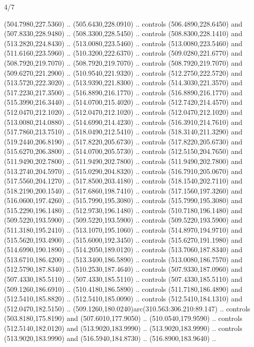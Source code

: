 \begin{flagdescription}{4/7}
\begin{scope}[shift={(0.5\flaglength,0.5\flagwidth)},scale=\flagwidth*\stretchfactor/820]
\begin{scope}[scale=1.87,xshift=-138mm,yshift=75mm]
\begin{scope}[y=0.8pt, x=0.8pt, yscale=-1, xscale=1]
\begin{scope}[fill=cd2a567]
  (504.7980,227.5360) .. (505.6430,228.0910) .. controls (506.4890,228.6450) and
  (507.8330,228.9480) .. (508.3300,228.5450) .. controls (508.8300,228.1410) and
  (513.2820,224.8430) .. (513.0080,223.5460) .. controls (513.0080,223.5460) and
  (511.6160,223.5960) .. (510.3200,222.6370) .. controls (509.0280,221.6770) and
  (508.7920,219.7070) .. (508.7920,219.7070) .. controls (508.7920,219.7070) and
  (509.6270,221.2900) .. (510.9540,221.9320) .. controls (512.2750,222.5720) and
  (513.5720,222.3020) .. (513.9390,221.8300) .. controls (514.3030,221.3570) and
  (517.2230,217.3500) .. (516.8890,216.1770) .. controls (516.8890,216.1770) and
  (515.3990,216.3440) .. (514.0700,215.4020) .. controls (512.7420,214.4570) and
  (512.0470,212.1020) .. (512.0470,212.1020) .. controls (512.0470,212.1020) and
  (513.0080,214.0880) .. (514.6990,214.4230) .. controls (516.3910,214.7610) and
  (517.7860,213.7510) .. (518.0490,212.5410) .. controls (518.3140,211.3290) and
  (519.2440,206.8190) .. (517.8220,205.6730) .. controls (517.8220,205.6730) and
  (515.6270,206.3800) .. (514.0700,205.5730) .. controls (512.5150,204.7650) and
  (511.9490,202.7800) .. (511.9490,202.7800) .. controls (511.9490,202.7800) and
  (513.2740,204.5970) .. (515.0290,204.8320) .. controls (516.7910,205.0670) and
  (517.5560,204.1270) .. (517.8500,203.4180) .. controls (518.1540,202.7110) and
  (518.2190,200.1540) .. (517.6860,198.7410) .. controls (517.1560,197.3260) and
  (516.0600,197.4260) .. (515.7990,195.3080) .. controls (515.7990,195.3080) and
  (515.2290,196.1480) .. (512.9730,196.1480) .. controls (510.7180,196.1480) and
  (509.5220,193.5900) .. (509.5220,193.5900) .. controls (509.5220,193.5900) and
  (511.3180,195.2410) .. (513.1070,195.1060) .. controls (514.8970,194.9710) and
  (515.5620,193.4900) .. (515.6000,192.3450) .. controls (515.6270,191.1980) and
  (514.6990,190.1890) .. (514.2050,189.0120) .. controls (513.7060,187.8340) and
  (513.6710,186.4200) .. (513.3400,186.5890) .. controls (513.0080,186.7570) and
  (512.5790,187.8340) .. (510.2530,187.4640) .. controls (507.9330,187.0960) and
  (507.4330,185.5110) .. (507.4330,185.5110) .. controls (507.4330,185.5110) and
  (509.1260,186.6910) .. (510.4180,186.5890) .. controls (511.7180,186.4890) and
  (512.5410,185.8820) .. (512.5410,185.0090) .. controls (512.5410,184.1310) and
  (512.0470,182.5150) .. (509.1260,180.0240)arc(310.563:306.210:89.147) ..
  controls (503.8180,175.8190) and (507.6010,177.9050) .. (510.0540,179.9590) ..
  controls (512.5140,182.0120) and (513.9020,183.9990) .. (513.9020,183.9990) ..
  controls (513.9020,183.9990) and (516.5940,184.8730) .. (516.8900,183.9640) ..

\end{scope}
\end{scope}
\end{scope}
\end{scope}
\end{flagdescription}
